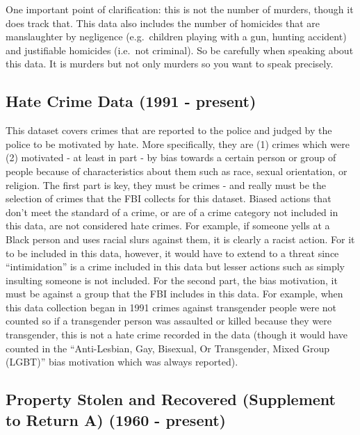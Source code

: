 \documentclass[
]{krantz}
\begin{document}
One important point of clarification: this is not the number
of murders, though it does track that. This data also
includes the number of homicides that are manslaughter by
negligence (e.g.~children playing with a gun, hunting
accident) and justifiable homicides (i.e.~not criminal). So
be carefully when speaking about this data. It is murders
but not only murders so you want to speak precisely.

\subsection{Hate Crime Data (1991 -
present)}\label{hate-crime-data-1991---present}

This dataset covers crimes that are reported to the police
and judged by the police to be motivated by hate. More
specifically, they are (1) crimes which were (2) motivated -
at least in part - by bias towards a certain person or group
of people because of characteristics about them such as
race, sexual orientation, or religion. The first part is
key, they must be crimes - and really must be the selection
of crimes that the FBI collects for this dataset. Biased
actions that don't meet the standard of a crime, or are of a
crime category not included in this data, are not considered
hate crimes. For example, if someone yells at a Black person
and uses racial slurs against them, it is clearly a racist
action. For it to be included in this data, however, it
would have to extend to a threat since ``intimidation'' is a
crime included in this data but lesser actions such as
simply insulting someone is not included. For the second
part, the bias motivation, it must be against a group that
the FBI includes in this data. For example, when this data
collection began in 1991 crimes against transgender people
were not counted so if a transgender person was assaulted or
killed because they were transgender, this is not a hate
crime recorded in the data (though it would have counted in
the ``Anti-Lesbian, Gay, Bisexual, Or Transgender, Mixed
Group (LGBT)'' bias motivation which was always reported).

\subsection{Property Stolen and Recovered (Supplement to
Return A) (1960 -
present)}\label{property-stolen-and-recovered-supplement-to-return-a-1960---present}
\end{document}
